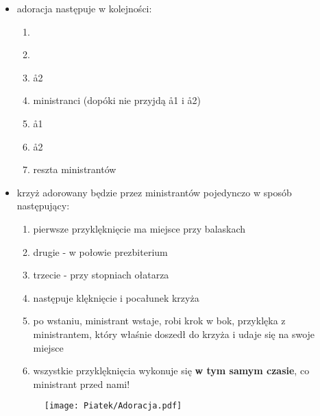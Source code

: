 \begin{itemize}
    \item adoracja następuje w kolejności:

          \begin{enumerate}\centering
              \item[] \ii~
              \item[] 
              \item[] \aa2
              \item[] ministranci (dopóki nie przyjdą \aa1 i \aa2)
              \item[] \aa1
              \item[] \aa2
              \item[] reszta ministrantów
          \end{enumerate}

    \item krzyż adorowany będzie przez ministrantów pojedynczo w sposób
          następujący:

          \begin{enumerate}[leftmargin=1cm]
              \item pierwsze przyklęknięcie ma miejsce przy balaskach
              \item drugie - w połowie prezbiterium
              \item trzecie - przy stopniach ołatarza
              \item następuje klęknięcie i pocałunek krzyża
              \item po wstaniu, ministrant wstaje, robi krok w bok, przyklęka z
                    ministrantem, który właśnie doszedł do krzyża  i udaje się
                    na swoje miejsce
              \item wszystkie przyklęknięcia wykonuje się \textbf{w tym samym
                        czasie}, co ministrant przed nami!
          \end{enumerate}

          \begin{figure}[h]
              \centering
              \texttt{[image: Piatek/Adoracja.pdf]}
          \end{figure}


\end{itemize}
